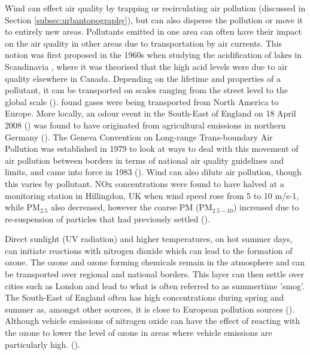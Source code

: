 Wind can effect air quality by trapping or recirculating air pollution (discussed in Section \ref{subsec:urbantopography}), but can also disperse the pollution or move it to entirely new areas. Pollutants emitted in one area can often have their impact on the air quality in other areas due to transportation by air currents. This notion was first proposed in the 1960s when studying the acidification of lakes in Scandinavia \cite{Summers1976}, where it was theorised that the high acid levels were due to air quality elsewhere in Canada. Depending on the lifetime and properties of a pollutant, it can be transported on scales ranging from the street level to the global scale (\cite{Monks2009}). \cite{Stohl2003} found gases were being transported from North America to Europe. More locally, an odour event in the South-East of England on 18 April 2008 (\cite{TheGuardian2008}) was found to have originated from agricultural emissions in northern Germany (\cite{Smethurst2012}). The Geneva Convention on Long-range Trans-boundary Air Pollution was established in 1979 to look at ways to deal with this movement of air pollution between borders in terms of national air quality guidelines and limits, and came into force in 1983 (\cite{UnitedNationsEconomicCommissionforEurope1983}). Wind can also dilute air pollution, though this varies by pollutant. NOx concentrations were found to have halved at a monitoring station in Hillingdon, UK when wind speed rose from 5 to 10 m/s-1, while PM$_{2.5}$ also decreased, however the coarse PM (PM$_{2.5 - 10}$) increased due to re-suspension of particles that had previously settled (\cite{DEFRA2007}).

Direct sunlight (UV radiation) and higher temperatures, on hot summer days, can initiate reactions with nitrogen dioxide which can lead to the formation of ozone. The ozone and ozone forming chemicals remain in the atmosphere and can be transported over regional and national borders. This layer can then settle over cities such as London and lead to what is often referred to as summertime 'smog'. The South-East of England often has high concentrations during spring and summer as, amongst other sources, it is close to European pollution sources (\cite{LondonAir}). Although vehicle emissions of nitrogen oxide can have the effect of reacting with the ozone to lower the level of ozone in areas where vehicle emissions are particularly high. (\cite{EnvironmentalProtectionAgency2012}).


